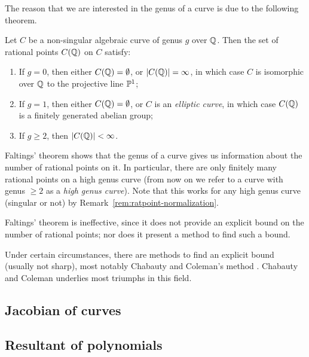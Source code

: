 The reason that we are interested in the genus of a curve is due to
the following theorem.

\begin{theorem}
  Let $C$ be a non-singular algebraic curve of genus $g$ over
  $\Q$. Then the set of rational points $C(\Q)$ on $C$ satisfy:
  \begin{enumerate}
  \item If $g = 0$, then either $C(\Q) = \es$, or $|C(\Q)| = \infty$,
    in which case $C$ is isomorphic over $\Q$ to the projective line
    $\P^1$;

  \item If $g = 1$, then either $C(\Q) = \es$, or $C$ is an
    \emph{elliptic curve}, in which case $C(\Q)$ is a finitely
    generated abelian group;

  \item If $g \ge 2$, then $|C(\Q)| < \infty$.
  \end{enumerate}
\end{theorem}

Faltings' theorem shows that the genus of a curve gives us information
about the number of rational points on it. In particular, there are
only finitely many rational points on a high genus curve (from now on
we refer to a curve with genus $\ge 2$ as a \emph{high genus
  curve}). Note that this works for any high genus curve (singular or
not) by Remark~\ref{rem:ratpoint-normalization}.

\begin{remark}
  Faltings' theorem is ineffective, since it does not provide an
  explicit bound on the number of rational points; nor does it present
  a method to find such a bound.

  Under certain circumstances, there are methods to find an explicit
  bound (usually not sharp), most notably Chabauty and Coleman's
  method \cite{MR808103}. Chabauty and Coleman underlies most triumphs
  in this field.
\end{remark}

\subsection{Jacobian of curves}


\subsection{Resultant of polynomials}

